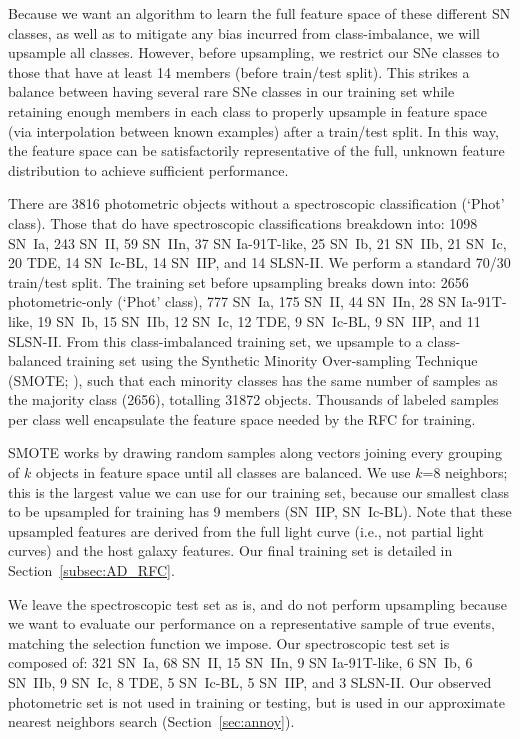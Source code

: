 \documentclass[twocolumn]{aastex63}
\begin{document}
Because we want an algorithm to learn the full feature space of these different SN classes, as well as to mitigate any bias incurred from class-imbalance, we will upsample all classes. However, before upsampling, we restrict our SNe classes to those that have at least 14 members (before train/test split). This strikes a balance between having several rare SNe classes in our training set while retaining enough members in each class to properly upsample in feature space (via interpolation between known examples) after a train/test split. In this way, the feature space can be satisfactorily representative of the full, unknown feature distribution to achieve sufficient performance. \par

There are 3816 photometric objects without a spectroscopic classification (`Phot' class). Those that do have spectroscopic classifications breakdown into: 1098 SN~Ia, 243 SN~II, 59 SN~IIn, 37 SN Ia-91T-like, 25 SN~Ib, 21 SN~IIb, 21 SN~Ic, 20 TDE, 14 SN~Ic-BL, 14 SN~IIP, and 14 SLSN-II. We perform a standard 70/30 train/test split. The training set before upsampling breaks down into: 2656 photometric-only (`Phot' class), 777 SN~Ia, 175 SN~II, 44 SN~IIn, 28 SN Ia-91T-like, 19 SN~Ib, 15 SN~IIb, 12 SN~Ic, 12 TDE, 9 SN~Ic-BL, 9 SN~IIP, and 11 SLSN-II. From this class-imbalanced training set, we upsample to a class-balanced training set using the Synthetic Minority Over-sampling Technique (SMOTE; \citealt{Chawla2002}), such that each minority classes has the same number of samples as the majority class (2656), totalling 31872 objects. Thousands of labeled samples per class well encapsulate the feature space needed by the RFC for training. \par

SMOTE works by drawing random samples along vectors joining every grouping of $k$ objects in feature space until all classes are balanced. We use $k$=8 neighbors; this is the largest value we can use for our training set, because our smallest class to be upsampled for training has 9 members (SN~IIP, SN~Ic-BL). %
Note that these upsampled features are derived from the full light curve (i.e., not partial light curves) and the host galaxy features. Our final training set is detailed in Section~\ref{subsec:AD_RFC}. \par

We leave the spectroscopic test set as is, and do not perform upsampling because we want to evaluate our performance on a representative sample of true events, matching the selection function we impose. Our spectroscopic test set is composed of: 321 SN~Ia, 68 SN~II, 15 SN~IIn, 9 SN Ia-91T-like, 6 SN~Ib, 6 SN~IIb, 9 SN~Ic, 8 TDE, 5 SN~Ic-BL, 5 SN~IIP, and 3 SLSN-II. Our observed photometric set is not used in training or testing, but is used in our approximate nearest neighbors search (Section~\ref{sec:annoy}). \par
\end{document}
